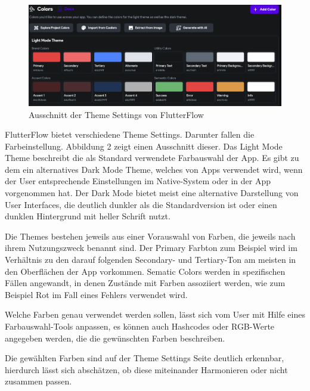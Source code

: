 \documentclass[acmtog, language=ngerman]{acmart}
\begin{document}
\begin{figure}[h]
    \centering
    \includegraphics[width=1\linewidth]{Screenshot 2024-01-27 at 15.38.16.png}
    \caption{Ausschnitt der Theme Settings von FlutterFlow}
    \label{fig:enter-label}
\end{figure}

FlutterFlow bietet verschiedene Theme Settings. Darunter fallen die Farbeinstellung. Abbildung 2 zeigt einen Ausschnitt dieser. Das Light Mode Theme beschreibt die als Standard verwendete Farbauswahl der App. Es gibt zu dem ein alternatives Dark Mode Theme, welches von Apps verwendet wird, wenn der User entsprechende Einstellungen im Native-System oder in der App vorgenommen hat. Der Dark Mode bietet meist eine alternative Darstellung von User Interfaces, die deutlich dunkler als die Standardversion ist oder einen dunklen Hintergrund mit heller Schrift nutzt. 

Die Themes bestehen jeweils aus einer Vorauswahl von Farben, die jeweils nach ihrem Nutzungszweck benannt sind. Der Primary Farbton zum Beispiel wird im Verhältnis zu den darauf folgenden Secondary- und Tertiary-Ton am meisten in den Oberflächen der App vorkommen. Sematic Colors werden in spezifischen Fällen angewandt, in denen Zustände mit Farben assoziiert werden, wie zum Beispiel Rot im Fall eines Fehlers verwendet wird. 

Welche Farben genau verwendet werden sollen, lässt sich vom User mit Hilfe eines Farbauswahl-Tools anpassen, es können auch Hashcodes oder RGB-Werte angegeben werden, die die gewünschten Farben beschreiben. 

Die gewählten Farben sind auf der Theme Settings Seite deutlich erkennbar, hierdurch lässt sich abschätzen, ob diese miteinander Harmonieren oder nicht zusammen passen.
\end{document}
